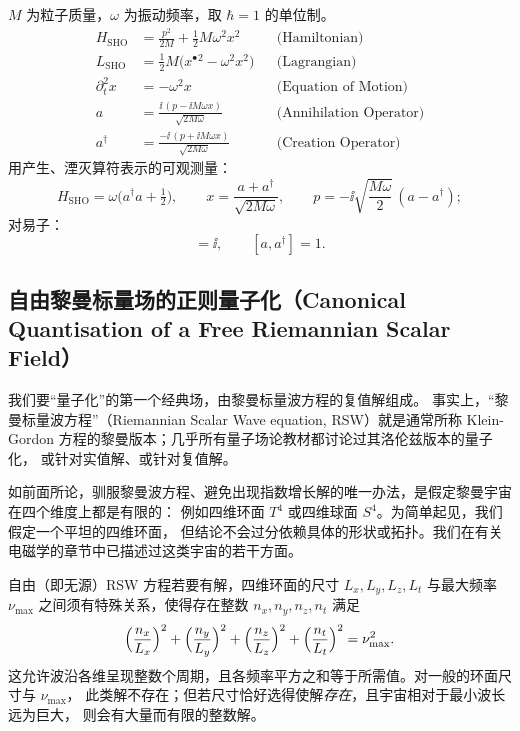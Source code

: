 \begin{keybox}[简谐振子汇总]
$M$ 为粒子质量，$\omega$ 为振动频率，取 $\hbar=1$ 的单位制。
\begin{align*}
H_{\text{SHO}}&=\frac{p^{2}}{2M}+\tfrac12 M\omega^{2}x^{2}
&&\text{(Hamiltonian)}\\
L_{\text{SHO}}&=\tfrac12 M\bigl(x^{\bullet}{}^{2}-\omega^{2}x^{2}\bigr)
&&\text{(Lagrangian)}\\
\partial_{t}^{2}x&=-\omega^{2}x
&&\text{(Equation of Motion)}\\
a&=\frac{\ii\,(p-\ii M\omega x)}{\sqrt{2M\omega}}
&&\text{(Annihilation Operator)}\\
a^{\dagger}&=\frac{-\ii\,(p+\ii M\omega x)}{\sqrt{2M\omega}}
&&\text{(Creation Operator)}
\end{align*}
用产生、湮灭算符表示的可观测量：
\begin{equation*}
H_{\text{SHO}}=\omega\bigl(a^{\dagger}a+\tfrac12\bigr),\qquad
x=\frac{a+a^{\dagger}}{\sqrt{2M\omega}},\qquad
p=-\ii\sqrt{\frac{M\omega}{2}}\,(a-a^{\dagger});
\end{equation*}
对易子：
\begin{equation*}
[x,p]=\ii,\qquad [a,a^{\dagger}]=1 .
\end{equation*}
\end{keybox}

\subsection{自由黎曼标量场的正则量子化（Canonical Quantisation of a Free Riemannian Scalar Field）}

我们要“量子化”的第一个经典场，由黎曼标量波方程的复值解组成。
事实上，“黎曼标量波方程”（Riemannian Scalar Wave equation, RSW）就是通常所称
Klein-Gordon 方程的黎曼版本；几乎所有量子场论教材都讨论过其洛伦兹版本的量子化，
或针对实值解、或针对复值解。

如前面所论，驯服黎曼波方程、避免出现指数增长解的唯一办法，是假定黎曼宇宙在四个维度上都是有限的：
例如四维环面 $T^{4}$ 或四维球面 $S^{4}$。为简单起见，我们假定一个平坦的四维环面，
但结论不会过分依赖具体的形状或拓扑。我们在有关电磁学的章节中已描述过这类宇宙的若干方面。

自由（即无源）RSW 方程若要有解，四维环面的尺寸 $L_{x},L_{y},L_{z},L_{t}$
与最大频率 $\nu_{\max}$ 之间须有特殊关系，使得存在整数 $n_{x},n_{y},n_{z},n_{t}$ 满足
\begin{equation*}
\Bigl(\frac{n_{x}}{L_{x}}\Bigr)^{2}+\Bigl(\frac{n_{y}}{L_{y}}\Bigr)^{2}
+\Bigl(\frac{n_{z}}{L_{z}}\Bigr)^{2}+\Bigl(\frac{n_{t}}{L_{t}}\Bigr)^{2}=\nu_{\max}^{2}.
\end{equation*}
这允许波沿各维呈现整数个周期，且各频率平方之和等于所需值。对一般的环面尺寸与 $\nu_{\max}$，
此类解不存在；但若尺寸恰好选得使解\emph{存在}，且宇宙相对于最小波长远为巨大，
则会有大量而有限的整数解。

